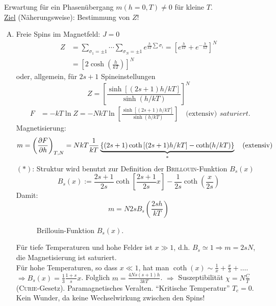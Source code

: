 Erwartung für ein Phasenübergang $m(h=0, T) \neq 0$ für kleine $T$. \\
\underline{Ziel} (Näherungsweise): Bestimmung von $Z$!
\begin{enumerate}[A)]
    \item Freie Spins im Magnetfeld: $J = 0$
    \begin{equation}
        \begin{split}
            Z &= \sum_{\sigma_1 = \pm 1} \cdots \sum_{\sigma_N = \pm 1} e^{ \frac{h}{kT} \sum \sigma_i } = \left[ e^{\frac{h}{kT}} + e^{-\frac{h}{kT}} \right]^N \\
            &= \left[2 \cosh \left( \frac{h}{kT} \right) \right]^N
        \end{split}
    \end{equation}
    oder, allgemein, für $2s+1$ Spineinstellungen
    \begin{equation}
        Z = \left[ \frac{\sinh \left[ (2s+1) h / kT \right]}{\sinh (h/kT)} \right]^N
    \end{equation}
    \begin{equation}
        \begin{split}
            F &= - k T \ln Z = - N k T \ln \left[  \frac{\sinh \left[ (2s+1) h / kT \right]}{\sinh (h/kT)} \right] \quad \text{(extensiv)}
        \end{split}saturiert.
    \end{equation}
    Magnetisierung:
    \begin{equation}
        m = \left( \frac{\partial F}{\partial h} \right)_{T, N} = N k T \frac{1}{k T} \underbrace{\left\{ (2s+1) \coth \left[ (2s+1) h/kT \right] - \coth(h/kT)  \right\}}_{*} \quad \text{(extensiv)}
    \end{equation}
    $(*)$: Struktur wird benutzt zur Definition der \textsc{Brillouin}-Funktion $B_s(x)$
    \begin{equation}
        B_s(x) := \frac{2s+1}{2s} \coth \left[ \frac{2s+1}{2s} x \right] - \frac{1}{2s} \coth \left( \frac{x}{2s} \right)
    \end{equation}
    Damit:
    \begin{equation}
        m = N 2 s B_s \left( \frac{2 s h}{k T} \right)
    \end{equation}
    \begin{figure}[H]
        \centering
        \def\svgwidth{0.5\textwidth}
        
        \caption{Brillouin-Funktion $B_s(x)$.}
        \label{img:BrillouinFkt}
    \end{figure}
    Für tiefe Temperaturen und hohe Felder ist $x \gg 1$, d.h. $B_s \simeq 1 \Rightarrow m = 2 s N$, die Magnetisierung ist saturiert. \\
    Für hohe Temperaturen, so dass $x \ll 1$, hat man $\coth(x) \sim \frac{1}{x} + \frac{x}{3} + \ldots$.
    $\Rightarrow B_s(x) = \frac{1}{3} \frac{1+s}{s} x$. Folglich $m = \frac{4 N s (s+1) h}{3 k T}$. $\Rightarrow$ Suszeptibilität $\chi = N \frac{C}{T}$ (\textsc{Curie}-Gesetz).
    Paramagnetisches Veralten. "`Kritische Temperatur"' $T_c = 0$. Kein Wunder, da keine Wechselwirkung zwischen den Spins!
    

\end{enumerate}

